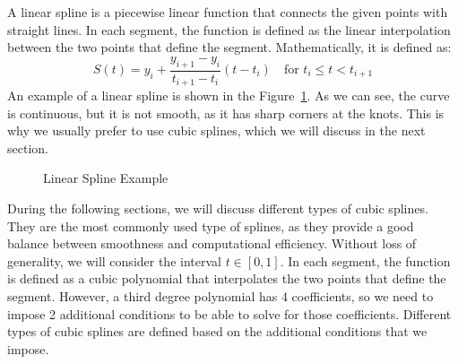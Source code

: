 A linear spline is a piecewise linear function that connects the given points with straight lines. In each segment, the function is defined as the linear interpolation between the two points that define the segment. Mathematically, it is defined as:
\[S(t) = y_i + \frac{y_{i+1} - y_i}{t_{i+1} - t_i} (t - t_i) \quad \text{for } t_i \leq t < t_{i+1}\]
An example of a linear spline is shown in the Figure~\ref{fig:linear_spline}. As we can see, the curve is continuous, but it is not smooth, as it has sharp corners at the knots. This is why we usually prefer to use cubic splines, which we will discuss in the next section.
\begin{figure}
    \centering
    \caption{Linear Spline Example}
    \label{fig:linear_spline}
\end{figure}

During the following sections, we will discuss different types of cubic splines. They are the most commonly used type of splines, as they provide a good balance between smoothness and computational efficiency. Without loss of generality, we will consider the interval $t\in [0,1]$. In each segment, the function is defined as a cubic polynomial that interpolates the two points that define the segment. However, a third degree polynomial has 4 coefficients, so we need to impose 2 additional conditions to be able to solve for those coefficients. Different types of cubic splines are defined based on the additional conditions that we impose.


